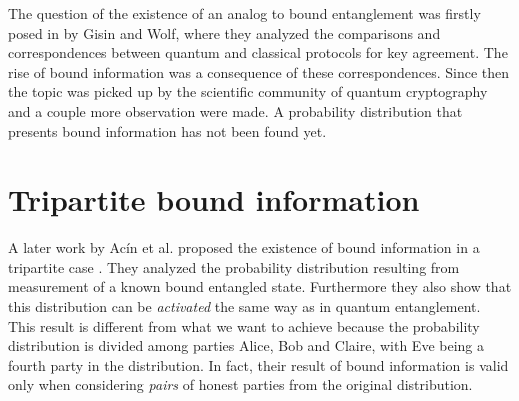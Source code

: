 The question of the existence of an analog to bound entanglement was firstly posed in \cite{GisWolf00} by Gisin and Wolf, where they analyzed the comparisons and correspondences between quantum and classical protocols for key agreement. 
The rise of bound information was a consequence of these correspondences.
Since then the topic was picked up by the scientific community of quantum cryptography and a couple more observation were made.
A probability distribution that presents bound information has not been found yet.

\section{Tripartite bound information}
    A later work by Ac\'in et al. proposed the existence of bound information in a tripartite case \cite{ACM04}. 
    They analyzed the probability distribution resulting from measurement of a known bound entangled state. 
    Furthermore they also show that this distribution can be \textit{activated} the same way as in quantum entanglement.
    This result is different from what we want to achieve because the probability distribution is divided among parties Alice, Bob and Claire, with Eve being a fourth party in the distribution. 
    In fact, their result of bound information is valid only when considering \emph{pairs} of honest parties from the original distribution.
